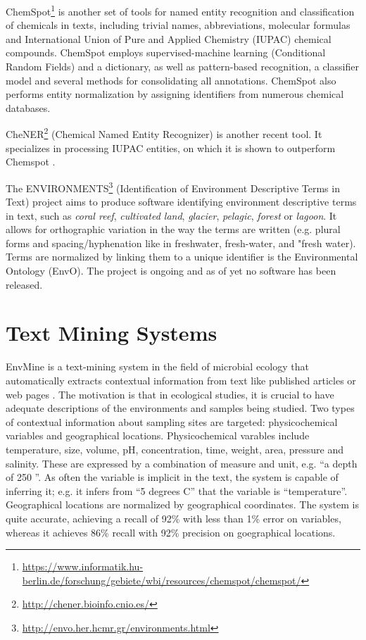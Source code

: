 ChemSpot\footnote{\url{https://www.informatik.hu-berlin.de/forschung/gebiete/wbi/resources/chemspot/chemspot/}} is another set of tools for named entity recognition and classification of chemicals in texts, including trivial names, abbreviations, molecular formulas and International Union of Pure and Applied Chemistry (IUPAC) chemical compounds. 
ChemSpot employs supervised-machine learning (Conditional Random Fields) and a dictionary, as well as pattern-based recognition, a classifier model and several methods for consolidating all annotations. 
ChemSpot also performs entity normalization by assigning identifiers from numerous chemical databases. 

CheNER\footnote{\url{http://chener.bioinfo.cnio.es/}} (Chemical Named Entity Recognizer) is another recent tool. It specializes in processing IUPAC entities, on which it is shown to outperform Chemspot \citep{Usie2014CheNER}.

The ENVIRONMENTS\footnote{\url{http://envo.her.hcmr.gr/environments.html}} (Identification of Environment Descriptive Terms in Text) project aims to produce software identifying environment descriptive terms in text, such as \emph{coral reef}, \emph{cultivated land}, \emph{glacier}, \emph{pelagic}, \emph{forest} or \emph{lagoon}.
It allows for orthographic variation in the way the terms are written (e.g. plural forms and spacing/hyphenation like in freshwater, fresh-water, and "fresh water).
Terms are normalized by linking them to a unique identifier is the Environmental Ontology (EnvO).
The project is ongoing and as of yet no software has been released.

\section{Text Mining Systems}

EnvMine is a text-mining system in the field of microbial ecology that automatically extracts contextual information from text like published articles or web pages \cite{Tamames2010EnvMine}.
The motivation is that in ecological studies, it is crucial to have adequate descriptions of the environments and samples being studied. 
Two types of contextual information about sampling sites are targeted: physicochemical variables and geographical locations.
Physicochemical varables include temperature, size, volume, pH, concentration, time, weight, area, pressure and salinity.
These are expressed by a combination of measure and unit, e.g. ``a depth of 250 ''.
As often the variable is implicit in the text, the system is capable of inferring it; e.g. it infers from ``5 degrees C'' that the variable is ``temperature''.  
Geographical locations are normalized by geographical coordinates. 
The system is quite accurate, achieving a recall of 92\% with less than 1\% error on variables, whereas it achieves 86\% recall with 92\% precision on goegraphical locations.

